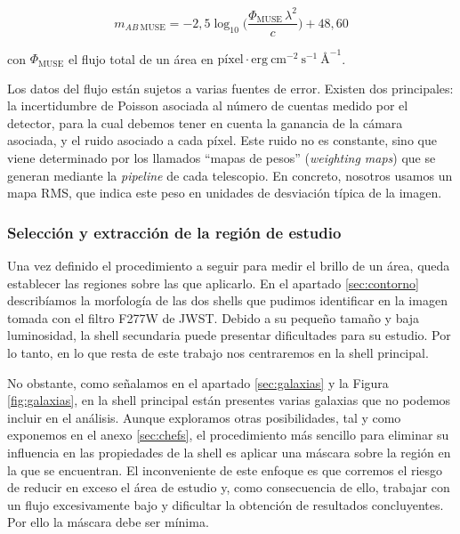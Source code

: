 \begin{equation}
    m_{AB\: \text{MUSE}} = - 2,5\log_{10}{\bigg(\frac{\Phi_{\text{MUSE}} \, \lambda^2}{c}\bigg)} + 48,60
\end{equation}

con \(\Phi_{\text{MUSE}}\) el flujo total de un área en \(\text{píxel} \cdot \text{erg}\: \text{cm}^{-2}\: \text{s}^{-1}\: \text{\AA}^{-1}\).

Los datos del flujo están sujetos a varias fuentes de error. Existen dos principales: la incertidumbre de Poisson asociada al número de cuentas medido por el detector, para la cual debemos tener en cuenta la ganancia de la cámara asociada, y el ruido asociado a cada píxel. Este ruido no es constante, sino que viene determinado por los llamados \enquote{mapas de pesos} (\textit{weighting maps}) que se generan mediante la \textit{pipeline} de cada telescopio. En concreto, nosotros usamos un mapa RMS, que indica este peso en unidades de desviación típica de la imagen. \par


\subsubsection{Selección y extracción de la región de estudio} \label{sec:mascara}
Una vez definido el procedimiento a seguir para medir el brillo de un área, queda establecer las regiones sobre las que aplicarlo. En el apartado \ref{sec:contorno} describíamos la morfología de las dos shells que pudimos identificar en la imagen tomada con el filtro F277W de JWST. Debido a su pequeño tamaño y baja luminosidad, la shell secundaria puede presentar dificultades para su estudio. Por lo tanto, en lo que resta de este trabajo nos centraremos en la shell principal. \par

No obstante, como señalamos en el apartado \ref{sec:galaxias} y la Figura \ref{fig:galaxias}, en la shell principal están presentes varias galaxias que no podemos incluir en el análisis. Aunque exploramos otras posibilidades, tal y como exponemos en el anexo \ref{sec:chefs}, el procedimiento más sencillo para eliminar su influencia en las propiedades de la shell es aplicar una máscara sobre la región en la que se encuentran. El inconveniente de este enfoque es que corremos el riesgo de reducir en exceso el área de estudio y, como consecuencia de ello, trabajar con un flujo excesivamente bajo y dificultar la obtención de resultados concluyentes. Por ello la máscara debe ser mínima. \par


